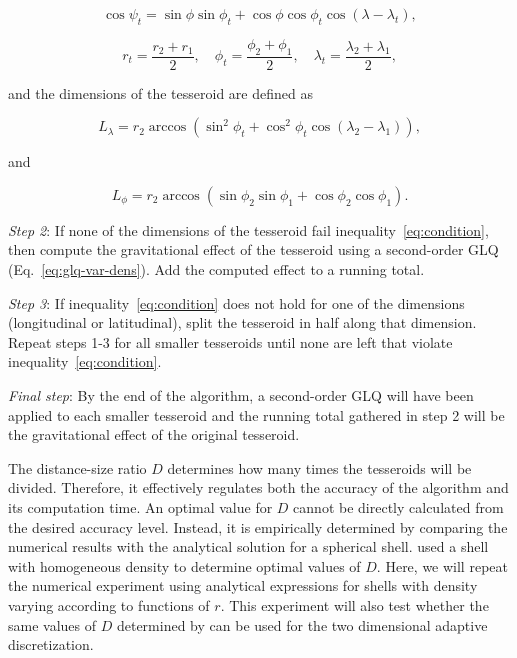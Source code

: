 \documentclass[extra, referee]{gji}
\begin{document}
\begin{equation}
    \cos\psi_t =
        \sin\phi\sin\phi_t + \cos\phi\cos\phi_t\cos(\lambda - \lambda_t),
\end{equation}

\begin{equation}
    r_t = \frac{r_2 + r_1}{2}, \quad
    \phi_t = \frac{\phi_2 + \phi_1}{2}, \quad
    \lambda_t = \frac{\lambda_2 + \lambda_1}{2},
\end{equation}

\noindent
and the dimensions of the tesseroid are defined as

\begin{equation}
    L_\lambda = r_2 \arccos(\sin^2\phi_t +
        \cos^2\phi_t\cos(\lambda_2 - \lambda_1)),
    \label{eq:sizelon}
\end{equation}

\noindent and

\begin{equation}
    L_\phi = r_2 \arccos(\sin\phi_2\sin\phi_1 + \cos\phi_2\cos\phi_1).
\end{equation}

\textit{Step 2}:
If none of the dimensions of the tesseroid fail inequality~\ref{eq:condition}, then
compute the gravitational effect of the tesseroid using a second-order GLQ
(Eq.~\ref{eq:glq-var-dens}).
Add the computed effect to a running total.

\textit{Step 3}:
If inequality~\ref{eq:condition} does not hold for one of the dimensions
(longitudinal or latitudinal), split the tesseroid in half along that dimension.
Repeat steps 1-3 for all smaller tesseroids until none are left that violate
inequality~\ref{eq:condition}.

\textit{Final step}:
By the end of the algorithm, a second-order GLQ will have been applied to each smaller
tesseroid and the running total gathered in step 2 will be the gravitational effect of
the original tesseroid.

The distance-size ratio $D$ determines how many times the tesseroids will be divided.
Therefore, it effectively regulates both the accuracy of the algorithm and its
computation time.
An optimal value for $D$ cannot be directly calculated from the desired accuracy level.
Instead, it is empirically determined by comparing the numerical results with the
analytical solution for a spherical shell.
\citet{Uieda2016} used a shell with homogeneous density to determine optimal values of
$D$.
Here, we will repeat the numerical experiment using analytical expressions for shells
with density varying according to functions of $r$.
This experiment will also test whether the same values of $D$ determined by
\citet{Uieda2016} can be used for the two dimensional adaptive discretization.
\end{document}
